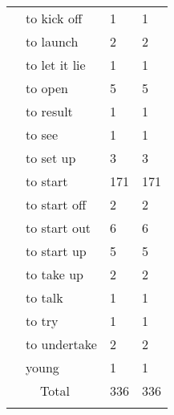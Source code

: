 \begin{tabularx}{\textwidth}{XXXX}
& to kick off &  1 &  1\\
& to launch &  2 &  2\\
& to let it lie &  1 &  1\\
& to open &  5 &  5\\
& to result &  1 &  1\\
& to see &  1 &  1\\
& to set up &  3 &  3\\
& to start &  171 &  171\\
& to start off &  2 &  2\\
& to start out &  6 &  6\\
& to start up &  5 &  5\\
& to take up &  2 &  2\\
& to talk &  1 &  1\\
& to try &  1 &  1\\
& to undertake &  2 &  2\\
& young &  1 &  1\\
\multicolumn{2}{c}{Total} &  336 &  336\\
\lspbottomrule
\end{tabularx}



